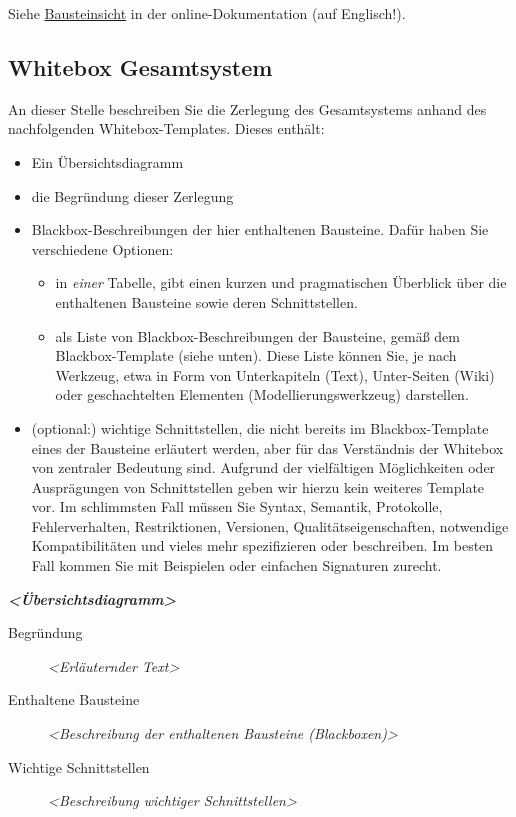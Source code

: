 \documentclass[
]{article}
\begin{document}
Siehe \href{https://docs.arc42.org/section-5/}{Bausteinsicht} in der
online-Dokumentation (auf Englisch!).

\subsection{Whitebox Gesamtsystem}\label{_whitebox_gesamtsystem}

An dieser Stelle beschreiben Sie die Zerlegung des Gesamtsystems anhand
des nachfolgenden Whitebox-Templates. Dieses enthält:

\begin{itemize}
\item
  Ein Übersichtsdiagramm
\item
  die Begründung dieser Zerlegung
\item
  Blackbox-Beschreibungen der hier enthaltenen Bausteine. Dafür haben
  Sie verschiedene Optionen:

  \begin{itemize}
  \item
    in \emph{einer} Tabelle, gibt einen kurzen und pragmatischen
    Überblick über die enthaltenen Bausteine sowie deren Schnittstellen.
  \item
    als Liste von Blackbox-Beschreibungen der Bausteine, gemäß dem
    Blackbox-Template (siehe unten). Diese Liste können Sie, je nach
    Werkzeug, etwa in Form von Unterkapiteln (Text), Unter-Seiten (Wiki)
    oder geschachtelten Elementen (Modellierungswerkzeug) darstellen.
  \end{itemize}
\item
  (optional:) wichtige Schnittstellen, die nicht bereits im
  Blackbox-Template eines der Bausteine erläutert werden, aber für das
  Verständnis der Whitebox von zentraler Bedeutung sind. Aufgrund der
  vielfältigen Möglichkeiten oder Ausprägungen von Schnittstellen geben
  wir hierzu kein weiteres Template vor. Im schlimmsten Fall müssen Sie
  Syntax, Semantik, Protokolle, Fehlerverhalten, Restriktionen,
  Versionen, Qualitätseigenschaften, notwendige Kompatibilitäten und
  vieles mehr spezifizieren oder beschreiben. Im besten Fall kommen Sie
  mit Beispielen oder einfachen Signaturen zurecht.
\end{itemize}

\emph{\textbf{\textless Übersichtsdiagramm\textgreater{}}}

\begin{description}
\item[Begründung]
\emph{\textless Erläuternder Text\textgreater{}}
\item[Enthaltene Bausteine]
\emph{\textless Beschreibung der enthaltenen Bausteine
(Blackboxen)\textgreater{}}
\item[Wichtige Schnittstellen]
\emph{\textless Beschreibung wichtiger Schnittstellen\textgreater{}}
\end{description}
\end{document}
